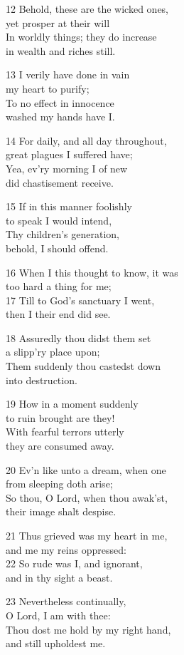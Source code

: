 12 Behold, these are the wicked ones,\\
yet prosper at their will\\
In worldly things; they do increase\\
in wealth and riches still.

13 I verily have done in vain\\
my heart to purify;\\
To no effect in innocence\\
washed my hands have I.

14 For daily, and all day throughout,\\
great plagues I suffered have;\\
Yea, ev’ry morning I of new\\
did chastisement receive.

15 If in this manner foolishly\\
to speak I would intend,\\
Thy children’s generation,\\
behold, I should offend.

16 When I this thought to know, it was\\
too hard a thing for me;\\
17 Till to God’s sanctuary I went,\\
then I their end did see.

18 Assuredly thou didst them set\\
a slipp’ry place upon;\\
Them suddenly thou castedst down\\
into destruction.

19 How in a moment suddenly\\
to ruin brought are they!\\
With fearful terrors utterly\\
they are consumed away.

20 Ev’n like unto a dream, when one\\
from sleeping doth arise;\\
So thou, O Lord, when thou awak’st,\\
their image shalt despise.

21 Thus grieved was my heart in me,\\
and me my reins oppressed:\\
22 So rude was I, and ignorant,\\
and in thy sight a beast.

23 Nevertheless continually,\\
O Lord, I am with thee:\\
Thou dost me hold by my right hand,\\
and still upholdest me.

